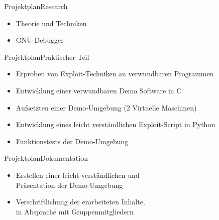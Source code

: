 \begin{frame}{Projektplan}{Research}
    \begin{itemize}
        \item Theorie und Techniken
        \item GNU-Debugger
    \end{itemize}
\end{frame}

\begin{frame}{Projektplan}{Praktischer Teil}
    \begin{itemize}
        \item Erproben von Exploit-Techniken an verwundbaren Programmen
        \item Entwicklung einer verwundbaren Demo Software in C
        \item Aufsetzten einer Demo-Umgebung (2 Virtuelle Maschinen)
        \item Entwicklung eines leicht verständlichen Exploit-Script in Python
        \item Funktionstests der Demo-Umgebung
    \end{itemize}
\end{frame}

\begin{frame}{Projektplan}{Dokumentation}
    \begin{itemize}
        \item Erstellen einer leicht verständlichen und \\ Präsentation der Demo-Umgebung \\        
        \item Verschriftlichung der erarbeiteten Inhalte, \\ in Absprache mit Gruppenmitgliedern
    \end{itemize}
\end{frame}